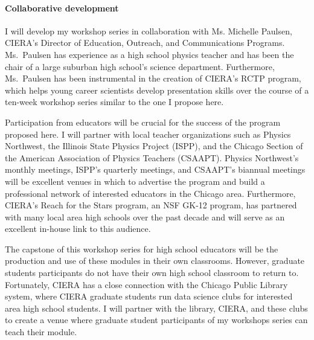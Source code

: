 \documentclass[11pt, preprint]{aastex}
\begin{document}
\vspace{-0.5cm}
\paragraph{Collaborative development}
\label{sct:development}
I will develop my workshop series in collaboration with Ms. Michelle Paulsen, CIERA's Director of Education, Outreach, and Communications Programs.
Ms.~Paulsen has experience as a high school physics teacher and has been the chair of a large suburban high school's science department.
Furthermore, Ms.~Paulsen has been instrumental in the creation of CIERA's RCTP program, which helps young career scientists develop presentation skills over the course of a ten-week workshop series similar to the one I propose here.

Participation from educators will be crucial for the success of the program proposed here.
I will partner with local teacher organizations such as Physics Northwest, the Illinois State Physics Project (ISPP), and the Chicago Section of the American Association of Physics Teachers (CSAAPT).
Physics Northwest's monthly meetings, ISPP's quarterly meetings, and CSAAPT's biannual meetings will be excellent venues in which to advertise the program and build a professional network of interested educators in the Chicago area.
Furthermore, CIERA's Reach for the Stars program, an NSF GK-12 program, has partnered with many local area high schools over the past decade and will serve as an excellent in-house link to this audience.

The capstone of this workshop series for high school educators will be the production and use of these modules in their own classrooms.
However, graduate students participants do not have their own high school classroom to return to.
Fortunately, CIERA has a close connection with the Chicago Public Library system, where CIERA graduate students run data science clubs for interested area high school students.
I will partner with the library, CIERA, and these clubs to create a venue where graduate student participants of my workshops series can teach their module.

\vspace{-0.5cm}
\end{document}
